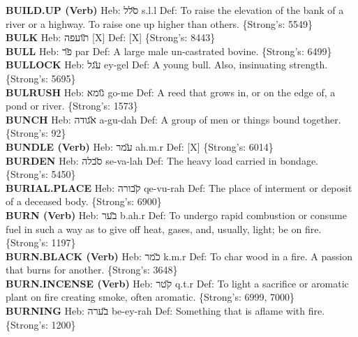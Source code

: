 {\textbf{BUILD.UP (Verb)} Heb: {\large\H סלל} s.l.l Def: To raise the elevation of the bank of a river or a highway. To raise one up higher than others. \{Strong's: 5549\}\hfill{}\\

\textbf{BULK} Heb: {\large\H תועפה} {[}X{]} Def: {[}X{]} \{Strong's: 8443\}\hfill{}\\

\textbf{BULL} Heb: {\large\H פר} par Def: A large male un-castrated bovine. \{Strong's: 6499\}\hfill{}\\

\textbf{BULLOCK} Heb: {\large\H עגל} ey-gel Def: A young bull. Also, insinuating strength. \{Strong's: 5695\}\hfill{}\\

\textbf{BULRUSH} Heb: {\large\H גומא} go-me Def: A reed that grows in, or on the edge of, a pond or river. \{Strong's: 1573\}\hfill{}\\

\textbf{BUNCH} Heb: {\large\H אגודה} a-gu-dah Def: A group of men or things bound together. \{Strong's: 92\}\hfill{}\\

\textbf{BUNDLE (Verb)} Heb: {\large\H עמר} ah.m.r Def: {[}X{]} \{Strong's: 6014\}\hfill{}\\

\textbf{BURDEN} Heb: {\large\H סבלה} se-va-lah Def: The heavy load carried in bondage. \{Strong's: 5450\}\hfill{}\\

\textbf{BURIAL.PLACE} Heb: {\large\H קבורה} qe-vu-rah Def: The place of interment or deposit of a deceased body. \{Strong's: 6900\}\hfill{}\\

\textbf{BURN (Verb)} Heb: {\large\H בער} b.ah.r Def: To undergo rapid combustion or consume fuel in such a way as to give off heat, gases, and, usually, light; be on fire. \{Strong's: 1197\}\hfill{}\\

\textbf{BURN.BLACK (Verb)} Heb: {\large\H כמר} k.m.r Def: To char wood in a fire. A passion that burns for another. \{Strong's: 3648\}\hfill{}\\

\textbf{BURN.INCENSE (Verb)} Heb: {\large\H קטר} q.t.r Def: To light a sacrifice or aromatic plant on fire creating smoke, often aromatic. \{Strong's: 6999, 7000\}\hfill{}\\

\textbf{BURNING} Heb: {\large\H בערה} be-ey-rah Def: Something that is aflame with fire. \{Strong's: 1200\}\hfill{}\\

}
